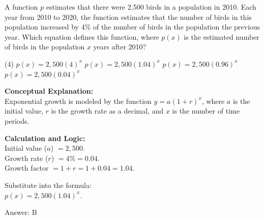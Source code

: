 \documentclass[11pt,paper=a4,answers]{exam}
\begin{document}
\begin{questions}
\pointsinrightmargin
\pointsdroppedatright
\marksnotpoints
{}
\pointformat{\boldmath\themarginpoints}
\bracketedpoints



\question
A function $p$ estimates that there were 2,500 birds in a population in 2010. Each year from 2010 to 2020, the function estimates that the number of birds in this population increased by 4\% of the number of birds in the population the previous year. Which equation defines this function, where $p(x)$ is the estimated number of birds in the population $x$ years after 2010?
\begin{tasks}(4)
    \task $p(x) = 2,500(4)^x$
    \task $p(x) = 2,500(1.04)^x$
    \task $p(x) = 2,500(0.96)^x$
    \task $p(x) = 2,500(0.04)^x$
\end{tasks}

\begin{solution}
\textbf{Conceptual Explanation:} \\
Exponential growth is modeled by the function $y = a(1 + r)^x$, where $a$ is the initial value, $r$ is the growth rate as a decimal, and $x$ is the number of time periods.

\vspace{20pt}

\textbf{Calculation and Logic:} \\
Initial value ($a$) $= 2,500$. \\
Growth rate ($r$) $= 4\% = 0.04$. \\
Growth factor $= 1 + r = 1 + 0.04 = 1.04$.

\vspace{10pt}

Substitute into the formula: \\
$p(x) = 2,500(1.04)^x$.

\vspace{25pt}

Answer: \colorbox{yellow!100}{B}
\end{solution}

\vspace{40pt}


\end{questions}
\end{document}
